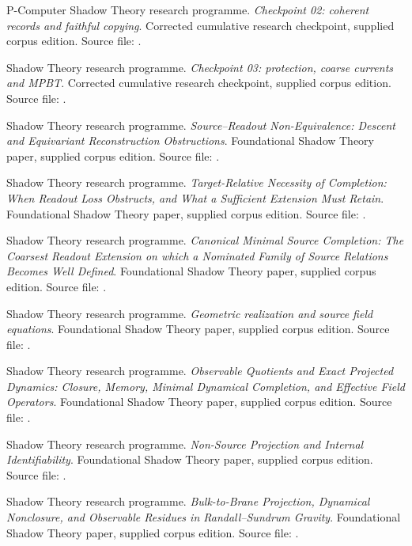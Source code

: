 \documentclass[11pt,oneside,openany]{book}
\theoremstyle{definition}
\theoremstyle{remark}\newtheorem{remark}[theorem]{Remark}
\begin{document}
\begin{thebibliography}{P-Computer}
Shadow Theory research programme.
\emph{Checkpoint 02: coherent records and faithful copying}.
Corrected cumulative research checkpoint, supplied corpus edition.
Source file: .

Shadow Theory research programme.
\emph{Checkpoint 03: protection, coarse currents and MPBT}.
Corrected cumulative research checkpoint, supplied corpus edition.
Source file: .

Shadow Theory research programme.
\emph{Source--Readout Non-Equivalence: Descent and Equivariant Reconstruction Obstructions}.
Foundational Shadow Theory paper, supplied corpus edition.
Source file: .

Shadow Theory research programme.
\emph{Target-Relative Necessity of Completion: When Readout Loss Obstructs, and What a Sufficient Extension Must Retain}.
Foundational Shadow Theory paper, supplied corpus edition.
Source file: .

Shadow Theory research programme.
\emph{Canonical Minimal Source Completion: The Coarsest Readout Extension on which a Nominated Family of Source Relations Becomes Well Defined}.
Foundational Shadow Theory paper, supplied corpus edition.
Source file: .

Shadow Theory research programme.
\emph{Geometric realization and source field equations}.
Foundational Shadow Theory paper, supplied corpus edition.
Source file: .

Shadow Theory research programme.
\emph{Observable Quotients and Exact Projected Dynamics: Closure, Memory, Minimal Dynamical Completion, and Effective Field Operators}.
Foundational Shadow Theory paper, supplied corpus edition.
Source file: .

Shadow Theory research programme.
\emph{Non-Source Projection and Internal Identifiability}.
Foundational Shadow Theory paper, supplied corpus edition.
Source file: .

Shadow Theory research programme.
\emph{Bulk-to-Brane Projection, Dynamical Nonclosure, and Observable Residues in Randall--Sundrum Gravity}.
Foundational Shadow Theory paper, supplied corpus edition.
Source file: .


\end{thebibliography}
\end{document}
